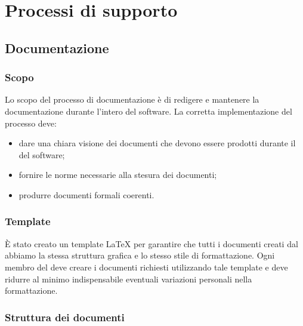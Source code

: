 \section{Processi di supporto}
    \subsection{Documentazione}
        \subsubsection{Scopo}
        Lo scopo del processo di documentazione è di redigere e mantenere la documentazione durante l'intero  del software. La corretta implementazione del processo deve:
        \begin{itemize}
            \item dare una chiara visione dei documenti che devono essere prodotti durante il  del software;
            \item fornire le norme necessarie alla stesura dei documenti;
            \item produrre documenti formali coerenti.
        \end{itemize}
        \subsubsection{Template}
        È stato creato un template \LaTeX{} per garantire che tutti i documenti creati dal  abbiamo la stessa struttura grafica e lo stesso stile di formattazione. Ogni membro del  deve creare i documenti richiesti utilizzando tale template e deve ridurre al minimo indispensabile eventuali variazioni personali nella formattazione.
        \subsubsection{Struttura dei documenti}

